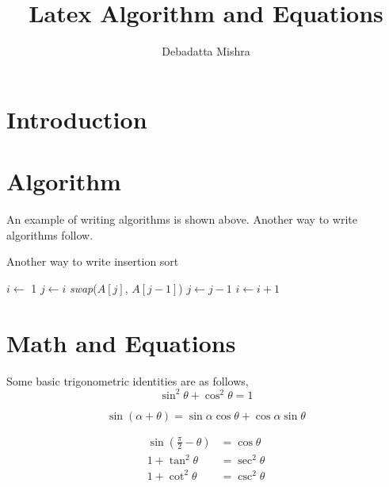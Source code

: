 \documentclass[a4paper, 10pt,twocolumn]{article}
\title{Latex Algorithm and Equations}
\author{Debadatta Mishra}
\date{}
\begin{document}
\maketitle
\begin{abstract}
\lipsum[15]
\end{abstract}    
\section{Introduction}
\lipsum
\section{Algorithm}


An example of writing algorithms is shown above.
Another way to write algorithms follow.

\begin{algorithm}
  \caption{Another way to write insertion sort}
  \label{algo:ins_sort1}
  \begin{algorithmic}[1]
     \newline
      \State $i \leftarrow$ 1
          \State $j \leftarrow i$ \newline
            \State \textit{swap}($A[j]$, $A[j-1]$)
            \State $j \leftarrow j -1$ 
         \EndWhile
      \State $i \leftarrow i + 1$
      \EndWhile
     \EndProcedure 
  \end{algorithmic}
\end{algorithm}

\section{Math and Equations}
Some basic trigonometric identities are as follows,
\begin{equation}
\sin^2\theta + \cos^2\theta = 1
\end{equation}

\begin{equation*}
\sin(\alpha + \theta) = \sin \alpha \cos \theta + \cos \alpha \sin \theta
\end{equation*}

\indent
\begin{align}
\sin(\frac{\pi}{2} -\theta) &= \cos\theta \\
1 + \tan^2 \theta &= \sec^2 \theta\\
1 + \cot^2 \theta &= \csc^2 \theta
\end{align}
\end{document}
